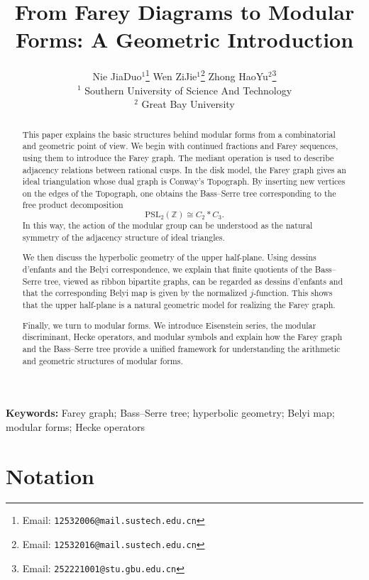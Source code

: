 \documentclass[10pt, a4paper]{article}
\title{From Farey Diagrams to Modular Forms: A Geometric Introduction}
\author{
  Nie JiaDuo$^1$\thanks{Email: \texttt{12532006@mail.sustech.edu.cn}} \quad 
  Wen ZiJie$^1$\thanks{Email: \texttt{12532016@mail.sustech.edu.cn}} \quad 
  Zhong HaoYu$^2$\thanks{Email: \texttt{252221001@stu.gbu.edu.cn}} \\
  \vspace{0.2cm}
  \small $^1$ Southern University of Science And Technology \\
  \small $^2$ Great Bay University
}
\date{}
\theoremstyle{definition}
\theoremstyle{remark}
\begin{document}
\maketitle

\begin{abstract}
This paper explains the basic structures behind modular forms from a combinatorial and geometric point of view. We begin with continued fractions and Farey sequences, using them to introduce the Farey graph. The mediant operation is used to describe adjacency relations between rational cusps. In the disk model, the Farey graph gives an ideal triangulation whose dual graph is Conway's Topograph. By inserting new vertices on the edges of the Topograph, one obtains the Bass--Serre tree corresponding to the free product decomposition
\[
\mathrm{PSL}_2(\mathbb Z)\cong C_2*C_3 .
\]
In this way, the action of the modular group can be understood as the natural symmetry of the adjacency structure of ideal triangles.

We then discuss the hyperbolic geometry of the upper half-plane. Using dessins d'enfants and the Belyi correspondence, we explain that finite quotients of the Bass--Serre tree, viewed as ribbon bipartite graphs, can be regarded as dessins d'enfants and that the corresponding Belyi map is given by the normalized \(j\)-function. This shows that the upper half-plane is a natural geometric model for realizing the Farey graph.

Finally, we turn to modular forms. We introduce Eisenstein series, the modular discriminant, Hecke operators, and modular symbols and explain how the Farey graph and the Bass--Serre tree provide a unified framework for understanding the arithmetic and geometric structures of modular forms.
\end{abstract}

\noindent\textbf{Keywords:}
Farey graph; Bass--Serre tree; hyperbolic geometry; Belyi map; modular forms; Hecke operators


\tableofcontents


\section*{Notation}
\end{document}
